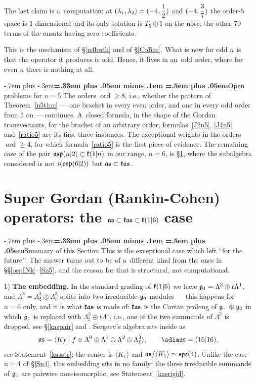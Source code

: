 \documentclass[12pt,a4paper]{amsart}
\makeatletter
\providecommand{\headspaces}{\spaceskip=.33em plus .05em minus .1em \xspaceskip=.5em plus .05em}
\def\subsection{\@startsection{subsection}{2}{0pt}{-1ex \@plus -.4ex \@minus -.2ex}%
  {-.7em plus -.3em}{\normalfont\normalsize\bfseries\boldmath\headspaces}}
\theoremstyle{thm}
\theoremstyle{definition}
\let\ssec\subsection
\newcommand {\tp}{\otimes}
\newcommand {\Nord}{\operatorname{ord}}   %
\makeatother
\begin{document}
The last claim is a~computation: at $(\lambda_1,\lambda_2)=(-4,\nfrac12)$ and
$(-4,\nfrac37)$ the order-$5$ space is $1$-dimensional and its only solution is $T_5\tp1$ on
the nose, the other $70$ terms of the ansatz having zero coefficients.

This is the mechanism of \S\ref{n4both} and of \S\ref{CoRm}. What is new for odd $n$ is
that the operator it produces is odd. Hence, it lives in an~odd order, where for even $n$ there is
nothing at all.

\ssec{Open problems for $n=5$}\label{n5open}
The orders $\Nord\geq8$, i.e., whether the pattern of Theorem~\ref{n5thm} --- one bracket in
every even order, and one in every odd order from $5$ on --- continues. A~closed formula,
in the shape of the Gordan transvectants, for the bracket of an arbitrary order;
formulas~\eqref{J2n5}, \eqref{J4n5} and~\eqref{ratio5} are its first three instances. The
exceptional weights in the orders $\Nord\geq4$, for which formula~\eqref{ratio5} is the first piece of
evidence. The remaining case of the pair ${\mathfrak{osp}}(n|2)\subset{\mathfrak{k}}(1|n)$ in our range, $n=6$, is
\S\ref{GRCAS}, where the subalgebra considered is not $i({\mathfrak{osp}}(6|2))$ but ${\mathfrak{as}}\subset{\mathfrak{k}}{\mathfrak{as}}$.

\section{Super Gordan (Rankin-Cohen) operators: the ${\mathfrak{as}}\subset {\mathfrak{k}}{\mathfrak{as}}\subset {\mathfrak{k}}(1|6)$ case} \label{GRCAS}

\ssec{Summary of this Section}\label{kassummary}
This is the exceptional case which \cite[\S1.3.1]{BLS1} left ``for the future\rq\rq. The answer
turns out to be of a~different kind from the ones in \S\S\ref{ospINk}--\ref{Sn5}, and the
reason for that is structural, not computational.

1) \textbf{The embedding.} In the standard grading of ${\mathfrak{k}}(1|6)$ we have
${\mathfrak{g}}_1=\Lambda^3\oplus t\Lambda^1$, and $\Lambda^3=\Lambda^3_\xi\oplus\Lambda^3_\eta$ splits
into two irreducible ${\mathfrak{g}}_0$-modules --- this happens for $n=6$ only, and it is what
${\mathfrak{k}}{\mathfrak{as}}$ is made of: ${\mathfrak{k}}{\mathfrak{as}}$ is the Cartan prolong of ${\mathfrak{g}}_-\oplus{\mathfrak{g}}_0$ in which ${\mathfrak{g}}_1$ is replaced with $\Lambda^3_\xi\oplus t\Lambda^1$, i.e., one of the two summands of $\Lambda^3$ is dropped, see \S\ref{kaspair} and \cite{Shex}. Sergeev's algebra sits inside as
\[
\fas=\langle K_f\mid f\in\Lambda^0\oplus\Lambda^1\oplus\Lambda^2\oplus\Lambda^3_\xi\rangle,
\qquad \sdim\fas=(16|16),
\]
see Statement~\ref{kasstr}; the center is $\langle K_1\rangle$ and
${\mathfrak{as}}/\langle K_1\rangle\simeq{\mathfrak{spe}}(4)$. Unlike the case $n=4$ of \S\ref{Sn4}, this embedding
sits in no family: the three irreducible summands of ${\mathfrak{g}}_1$ are pairwise non-isomorphic, see
Statement~\ref{kasrigid}.
\end{document}
